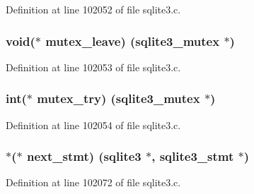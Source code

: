 Definition at line 102052 of file sqlite3.\+c.

\hypertarget{structsqlite3__api__routines_a2992e367409871e35e5094a8ea2e7be2}{}
\subsubsection[{mutex\+\_\+leave}]{\setlength{\rightskip}{0pt plus 5cm}void($\ast$ mutex\+\_\+leave) ({\bf sqlite3\+\_\+mutex} $\ast$)}\label{structsqlite3__api__routines_a2992e367409871e35e5094a8ea2e7be2}


Definition at line 102053 of file sqlite3.\+c.

\hypertarget{structsqlite3__api__routines_af79d9da98d2257754895a48ae553dd06}{}
\subsubsection[{mutex\+\_\+try}]{\setlength{\rightskip}{0pt plus 5cm}int($\ast$ mutex\+\_\+try) ({\bf sqlite3\+\_\+mutex} $\ast$)}\label{structsqlite3__api__routines_af79d9da98d2257754895a48ae553dd06}


Definition at line 102054 of file sqlite3.\+c.

\hypertarget{structsqlite3__api__routines_ad7e3588eb6c4aca4ef8d5c3ee52a5edc}{}
\subsubsection[{next\+\_\+stmt}]{$\ast$($\ast$ next\+\_\+stmt) ({\bf sqlite3} $\ast$, {\bf sqlite3\+\_\+stmt} $\ast$)}\label{structsqlite3__api__routines_ad7e3588eb6c4aca4ef8d5c3ee52a5edc}


Definition at line 102072 of file sqlite3.\+c.

\hypertarget{structsqlite3__api__routines_a9a5afaf1d25c526dda2af954066ff30a}{}
